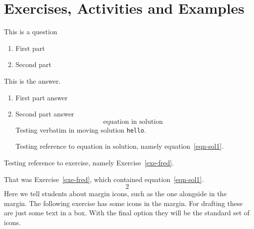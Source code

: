 \documentclass[solutionsatend,twocolumnsolutions]{ouunit}
\begin{document}
\section{Exercises, Activities and Examples}
\lipsum[134]
\begin{exercise}
\label{exe-fred}
This is a question
\begin{enumerate}
\item First part
\item Second part
\end{enumerate}
\begin{solution}
This is the answer.
\begin{enumerate}
\item First part answer
\item Second part answer
\begin{equation}
\text{equation in solution}\label{eqn-sol1}
\end{equation}
Testing verbatim in moving solution \verb"hello".

Testing reference to equation in solution, namely equation~\ref{eqn-sol1}.

\end{enumerate}
\end{solution}
\noendrule
\end{exercise}
Testing reference to exercise, namely Exercise~\ref{exe-fred}.

\begin{exercise}
\lipsum[133]
\begin{solution}
\lipsum[133]
\end{solution}
\noendrule
\end{exercise}
\begin{exercise}
\lipsum[133]
\begin{solution}
\lipsum[133]

\lipsum[1]
\end{solution}
\end{exercise}
That was Exercise~\ref{exe-fred}, which contained equation~\ref{eqn-sol1}.
\begin{equation}
2
\end{equation}
Here we tell students about margin icons, such as the one alongside in the margin. The following exercise has some icons in the margin. For drafting these are just some text in a box. With the final option they will be the standard set of icons.
\end{document}
